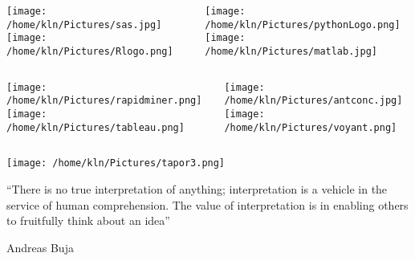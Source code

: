 \documentclass[8pt]{beamer}
\begin{document}
\begin{frame}
\begin{columns}
\begin{column}{0.5\textwidth}
   \begin{center}
   \texttt{[image: /home/kln/Pictures/sas.jpg]}\\
   \bigskip
   \texttt{[image: /home/kln/Pictures/Rlogo.png]}
   \end{center}
\end{column}
\begin{column}{0.5\textwidth}
    	\begin{center}
    \texttt{[image: /home/kln/Pictures/pythonLogo.png]}\\
    \bigskip
    \texttt{[image: /home/kln/Pictures/matlab.jpg]}
    \end{center}
\end{column}
\end{columns}
\end{frame}

\begin{frame}
\begin{columns}
\begin{column}{0.5\textwidth}
   \begin{center}
    \texttt{[image: /home/kln/Pictures/rapidminer.png]}\\
    \bigskip
    \texttt{[image: /home/kln/Pictures/tableau.png]}
    \end{center}
\end{column}
\begin{column}{0.5\textwidth}
    \begin{center}
    \texttt{[image: /home/kln/Pictures/antconc.jpg]}\\
    \bigskip
    \texttt{[image: /home/kln/Pictures/voyant.png]}
    \end{center}
\end{column}
\end{columns}
\end{frame}

\begin{frame}
	\begin{center}
		\texttt{[image: /home/kln/Pictures/tapor3.png]}
	\end{center}
\end{frame}

\begin{frame}
``There is no true interpretation of anything; interpretation is a vehicle in the service of human comprehension. The value of interpretation is in enabling others to fruitfully think about an idea'' \begin{flushright}
Andreas Buja
\end{flushright}
\end{frame}
\end{document}
